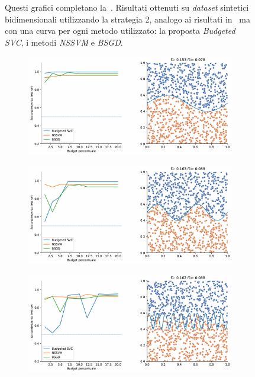 \begin{appendices}
\begin{figure}[ht]
\begin{subfigure}{.8\textwidth}
    \end{subfigure}
     \caption[Risultati su \emph{dataset} sintetici utilizzando strategia 2 in confronto ad altri metodi.]{Questi grafici completano la~. Risultati ottenuti su \emph{dataset} sintetici bidimensionali utilizzando la strategia 2, analogo ai risultati in~ ma con una curva per ogni metodo utilizzato: la proposta \emph{Budgeted SVC}, i metodi \emph{NSSVM} e \emph{BSGD}.}
\end{figure}
\begin{figure}[ht]\ContinuedFloat
    \centering
    \begin{subfigure}{.8\textwidth}
        \centering
        \includegraphics[width=\textwidth]{img/comp_new/10.pdf}
    \end{subfigure}%
    \hfill
    \begin{subfigure}{.8\textwidth}
        \centering
        \includegraphics[width=\textwidth]{img/comp_new/11.pdf}
    \end{subfigure}
    \hfill
    \begin{subfigure}{.8\textwidth}
        \centering
        \includegraphics[width=\textwidth]{img/comp_new/13.pdf}

\end{subfigure}
\end{figure}
\end{appendices}
